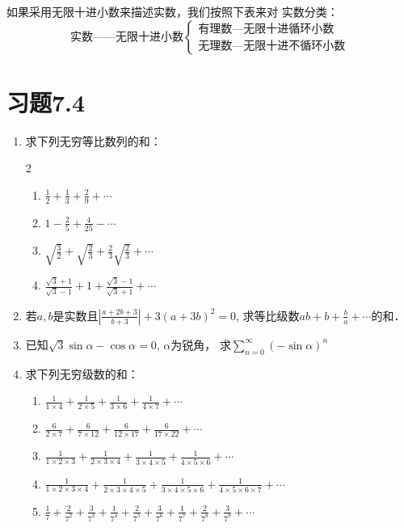 如果采用无限十进小数来描述实数，我们按照下表来对
实数分类：
\[\text{实数——无限十进小数}\begin{cases}
    \text{有理数—无限十进循环小数}\\
    \text{无理数—无限十进不循环小数}
\end{cases}\]

\section*{习题7.4}
\begin{enumerate}
    \item 求下列无穷等比数列的和：
    \begin{multicols}{2}
\begin{enumerate}
    \item $\frac{1}{2}+\frac{1}{3}+\frac{2}{9}+\cdots$
    \item $1-\frac{2}{5}+\frac{4}{25}-\cdots$
    \item $\sqrt{\frac{3}{2}}+\sqrt{\frac{2}{3}}+\frac{2}{3}\sqrt{\frac{2}{3}}+\cdots$
    \item $\frac{\sqrt{3}+1}{\sqrt{3}-1}+1+\frac{\sqrt{3}-1}{\sqrt{3}+1}+\cdots$
\end{enumerate}        
    \end{multicols}


\item 若$a,b$是实数且$\left|\frac{a+2b+3}{b+3}\right|+3(a+3b)^2=0$, 求等比级数$ab+b+\frac{b}{a}+\cdots$的和．
\item 已知$\sqrt{3}\sin\alpha-\cos\alpha=0$, $\alpha$为锐角，
求$\sum^{\infty}_{n=0}(-\sin\alpha)^n$

\item 求下列无穷级数的和：
\begin{enumerate}
\item $\frac{1}{1 \times 4}+\frac{1}{2 \times 5}+\frac{1}{3 \times 6}+\frac{1}{4 \times 7}+\cdots$
\item $\frac{6}{2 \times 7}+\frac{6}{7 \times 12}+\frac{6}{12 \times 17}+\frac{6}{17 \times 22}+\cdots$
\item $\frac{1}{1 \times 2 \times 3}+\frac{1}{2 \times 3 \times 4}+\frac{1}{3 \times 4 \times 5}+\frac{1}{4 \times 5 \times 6}+\cdots$
\item $\frac{1}{1 \times 2 \times 3 \times 4}+\frac{1}{2 \times 3 \times 4 \times 5}+\frac{1}{3 \times 4 \times 5 \times 6}+\frac{1}{4 \times 5 \times 6 \times 7}+\cdots$
\item $\frac{1}{7}+\frac{2}{7^{2}}+\frac{3}{7^{3}}+\frac{1}{7^{4}}+\frac{2}{7^{5}}+\frac{3}{7^{6}}+\frac{1}{7^{7}}+\frac{2}{7^{8}}+\frac{3}{7^{9}}+\cdots$
\end{enumerate}



\end{enumerate}
